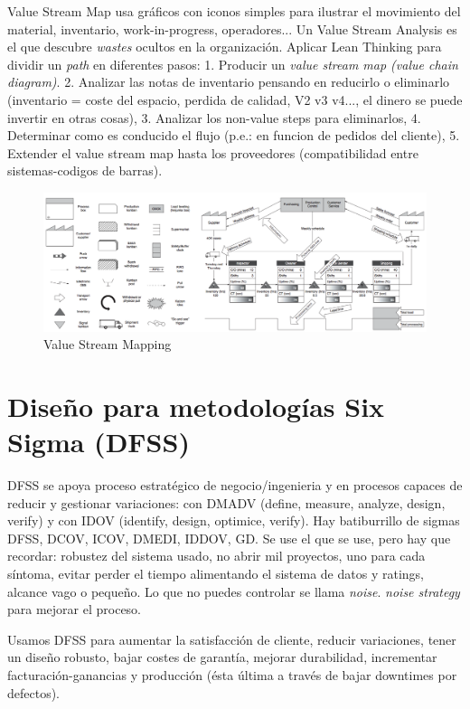 \documentclass[]{article}
\begin{document}
Value Stream Map usa gráficos con iconos simples para ilustrar el movimiento del material, inventario, work-in-progress, operadores... Un Value Stream Analysis es el que descubre \textit{wastes} ocultos en la organización. Aplicar Lean Thinking para dividir un \textit{path} en diferentes pasos: 1. Producir un \textit{value stream map (value chain diagram)}. 2. Analizar las notas de inventario pensando en reducirlo o eliminarlo (inventario = coste del espacio, perdida de calidad, V2 v3 v4..., el dinero se puede invertir en otras cosas), 3. Analizar los non-value steps para eliminarlos, 4. Determinar como es conducido el flujo (p.e.: en funcion de pedidos del cliente), 5. Extender el value stream map hasta los proveedores (compatibilidad entre sistemas-codigos de barras).

\begin{figure}[ht!]
	\centering
	\includegraphics[width=170mm]{imagenes/ValueStreamMapping.png}
	\caption{Value Stream Mapping}
	\label{fig:ValueStreamMapping}
\end{figure}

\section{Diseño para metodologías Six Sigma (DFSS)}

DFSS se apoya proceso estratégico de negocio/ingenieria y en procesos capaces de reducir y gestionar variaciones: con DMADV (define, measure, analyze, design, verify) y con IDOV (identify, design, optimice, verify). Hay batiburrillo de sigmas DFSS, DCOV, ICOV, DMEDI, IDDOV, GD. Se use el que se use, pero hay que recordar: robustez del sistema usado, no abrir mil proyectos, uno para cada síntoma, evitar perder el tiempo alimentando el sistema de datos y ratings, alcance vago o pequeño. Lo que no puedes controlar se llama \textit{noise}. \textit{noise strategy} para mejorar el proceso.

Usamos DFSS para aumentar la satisfacción de cliente, reducir variaciones, tener un diseño robusto, bajar costes de garantía, mejorar durabilidad, incrementar facturación-ganancias y producción (ésta última a través de bajar downtimes por defectos).
\end{document}
